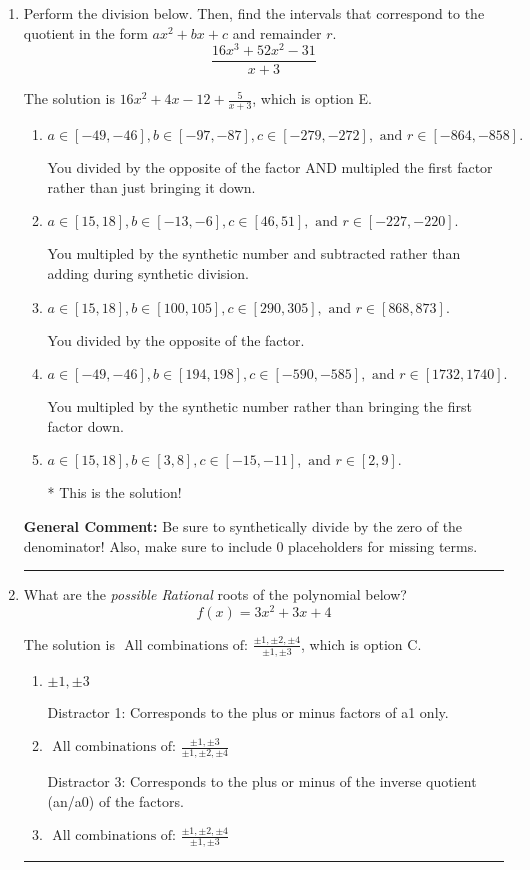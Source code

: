 \documentclass{extbook}[14pt]
\newcommand{\litem}[1]{\item #1

\rule{\textwidth}{0.4pt}}
\begin{document}
\begin{enumerate}\litem{
Perform the division below. Then, find the intervals that correspond to the quotient in the form $ax^2+bx+c$ and remainder $r$.
\[ \frac{16x^{3} +52 x^{2} -31}{x + 3} \]

The solution is \( 16x^{2} +4 x -12 + \frac{5}{x + 3} \), which is option E.\begin{enumerate}[label=\Alph*.]
\item \( a \in [-49, -46], b \in [-97, -87], c \in [-279, -272], \text{ and } r \in [-864, -858]. \)

 You divided by the opposite of the factor AND multipled the first factor rather than just bringing it down.
\item \( a \in [15, 18], b \in [-13, -6], c \in [46, 51], \text{ and } r \in [-227, -220]. \)

 You multipled by the synthetic number and subtracted rather than adding during synthetic division.
\item \( a \in [15, 18], b \in [100, 105], c \in [290, 305], \text{ and } r \in [868, 873]. \)

 You divided by the opposite of the factor.
\item \( a \in [-49, -46], b \in [194, 198], c \in [-590, -585], \text{ and } r \in [1732, 1740]. \)

 You multipled by the synthetic number rather than bringing the first factor down.
\item \( a \in [15, 18], b \in [3, 8], c \in [-15, -11], \text{ and } r \in [2, 9]. \)

* This is the solution!
\end{enumerate}

\textbf{General Comment:} Be sure to synthetically divide by the zero of the denominator! Also, make sure to include 0 placeholders for missing terms.
}
\litem{
What are the \textit{possible Rational} roots of the polynomial below?
\[ f(x) = 3x^{2} +3 x + 4 \]

The solution is \( \text{ All combinations of: }\frac{\pm 1,\pm 2,\pm 4}{\pm 1,\pm 3} \), which is option C.\begin{enumerate}[label=\Alph*.]
\item \( \pm 1,\pm 3 \)

 Distractor 1: Corresponds to the plus or minus factors of a1 only.
\item \( \text{ All combinations of: }\frac{\pm 1,\pm 3}{\pm 1,\pm 2,\pm 4} \)

 Distractor 3: Corresponds to the plus or minus of the inverse quotient (an/a0) of the factors. 
\item \( \text{ All combinations of: }\frac{\pm 1,\pm 2,\pm 4}{\pm 1,\pm 3} \)


\end{enumerate}}
\end{enumerate}
\end{document}
